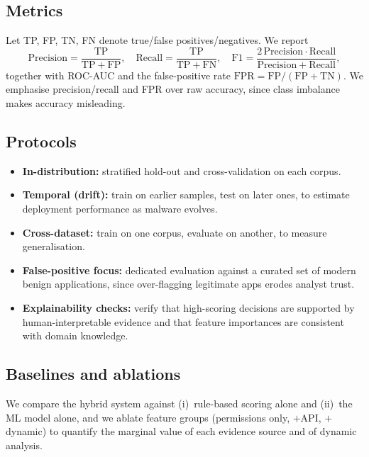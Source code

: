 \documentclass[11pt,a4paper]{article}
\begin{document}
\subsection{Metrics}
Let TP, FP, TN, FN denote true/false positives/negatives. We report
\[
\mathrm{Precision}=\frac{\mathrm{TP}}{\mathrm{TP}+\mathrm{FP}},\quad
\mathrm{Recall}=\frac{\mathrm{TP}}{\mathrm{TP}+\mathrm{FN}},\quad
\mathrm{F1}=\frac{2\,\mathrm{Precision}\cdot\mathrm{Recall}}
{\mathrm{Precision}+\mathrm{Recall}},
\]
together with ROC-AUC and the false-positive rate
$\mathrm{FPR}=\mathrm{FP}/(\mathrm{FP}+\mathrm{TN})$. We emphasise precision/recall and
FPR over raw accuracy, since class imbalance makes accuracy misleading.

\subsection{Protocols}
\begin{itemize}
    \item \textbf{In-distribution:} stratified hold-out and cross-validation on each corpus.
    \item \textbf{Temporal (drift):} train on earlier samples, test on later ones, to estimate deployment performance as malware evolves.
    \item \textbf{Cross-dataset:} train on one corpus, evaluate on another, to measure generalisation.
    \item \textbf{False-positive focus:} dedicated evaluation against a curated set of modern benign applications, since over-flagging legitimate apps erodes analyst trust.
    \item \textbf{Explainability checks:} verify that high-scoring decisions are supported by human-interpretable evidence and that feature importances are consistent with domain knowledge.
\end{itemize}

\subsection{Baselines and ablations}
We compare the hybrid system against (i)~rule-based scoring alone and (ii)~the ML model
alone, and we ablate feature groups (permissions only, $+$API, $+$dynamic) to quantify the
marginal value of each evidence source and of dynamic analysis.

\end{document}
